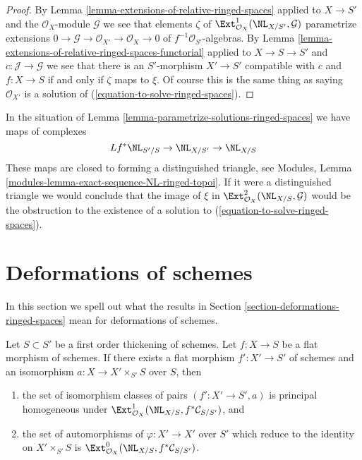 \begin{proof}
By Lemma \ref{lemma-extensions-of-relative-ringed-spaces}
applied to $X \to S'$ and the $\mathcal{O}_X$-module $\mathcal{G}$
we see that elements $\zeta$ of
$\Ext^1_{\mathcal{O}_X}(\NL_{X/S'}, \mathcal{G})$
parametrize extensions
$0 \to \mathcal{G} \to \mathcal{O}_{X'} \to \mathcal{O}_X \to 0$
of $f^{-1}\mathcal{O}_{S'}$-algebras. By
Lemma \ref{lemma-extensions-of-relative-ringed-spaces-functorial} applied
to $X \to S \to S'$ and $c : \mathcal{J} \to \mathcal{G}$
we see that there is an $S'$-morphism
$X' \to S'$ compatible with $c$ and $f : X \to S$ if and only if
$\zeta$ maps to $\xi$. Of course this is the same thing as saying
$\mathcal{O}_{X'}$ is a
solution of (\ref{equation-to-solve-ringed-spaces}).
\end{proof}

\begin{remark}
\label{remark-parametrize-solutions-ringed-spaces}
In the situation of
Lemma \ref{lemma-parametrize-solutions-ringed-spaces}
we have maps of complexes
$$
Lf^*\NL_{S'/S} \to \NL_{X/S'} \to \NL_{X/S}
$$
These maps are closed to forming a distinguished triangle, see
Modules, Lemma \ref{modules-lemma-exact-sequence-NL-ringed-topoi}.
If it were a distinguished triangle we would conclude
that the image of $\xi$ in $\Ext^2_{\mathcal{O}_X}(\NL_{X/S}, \mathcal{G})$
would be the obstruction to the existence of a solution to
(\ref{equation-to-solve-ringed-spaces}).
\end{remark}













\section{Deformations of schemes}
\label{section-deformations-schemes}

\noindent
In this section we spell out what the results in
Section \ref{section-deformations-ringed-spaces}
mean for deformations of schemes.

\begin{lemma}
\label{lemma-deform}
Let $S \subset S'$ be a first order thickening of schemes.
Let $f : X \to S$ be a flat morphism of schemes.
If there exists a flat morphism $f' : X' \to S'$ of schemes
and an isomorphism $a : X \to X' \times_{S'} S$ over $S$, then
\begin{enumerate}
\item the set of isomorphism classes of pairs $(f' : X' \to S', a)$ is
principal homogeneous under
$\Ext^1_{\mathcal{O}_X}(\NL_{X/S}, f^*\mathcal{C}_{S/S'})$, and
\item the set of automorphisms of $\varphi : X' \to X'$
over $S'$ which reduce to the identity on $X' \times_{S'} S$
is $\Ext^0_{\mathcal{O}_X}(\NL_{X/S}, f^*\mathcal{C}_{S/S'})$.
\end{enumerate}
\end{lemma}

